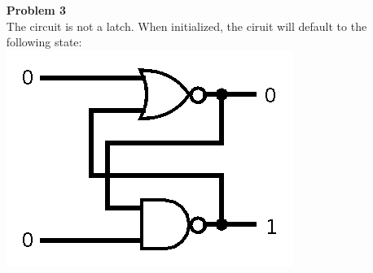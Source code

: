 \documentclass{article}
\begin{document}
\begin{itemize}
	\item [\textbf{Problem 3}]\hspace{0pt}\\
	The circuit is not a latch. When initialized, the ciruit will default to the following state:\\
	\includegraphics[scale=0.5]{hw4-3a}


\end{itemize}
\end{document}
